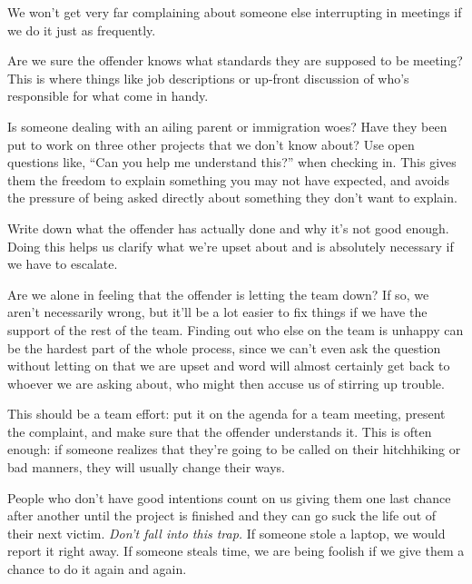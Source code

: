 \documentclass[
]{krantz}
\providecommand{\tightlist}{%
  \setlength{\itemsep}{0pt}\setlength{\parskip}{0pt}}
\begin{document}
\begin{description}
\tightlist
\item[Make sure we are not guilty of the same sin.]
We won't get very far complaining about someone else interrupting in meetings
if we do it just as frequently.
\item[Check expectations.]
Are we sure the offender knows what standards they are supposed to be meeting?
This is where things like job descriptions
or up-front discussion of who's responsible for what
come in handy.
\item[Check the situation.]
Is someone dealing with an ailing parent or immigration woes?
Have they been put to work on three other projects that we don't know about?
Use open questions like, ``Can you help me understand this?'' when checking in.
This gives them the freedom to explain something you may not have expected,
and avoids the pressure of being asked directly about something they don't want to explain.
\item[Document the offense.]
Write down what the offender has actually done and why it's not good enough.
Doing this helps us clarify what we're upset about
and is absolutely necessary if we have to escalate.
\item[Check with other team members.]
Are we alone in feeling that the offender is letting the team down?
If so, we aren't necessarily wrong,
but it'll be a lot easier to fix things if we have the support of the rest of the team.
Finding out who else on the team is unhappy can be the hardest part of the whole process,
since we can't even ask the question without letting on that we are upset
and word will almost certainly get back to whoever we are asking about,
who might then accuse us of stirring up trouble.
\item[Talk with the offender.]
This should be a team effort:
put it on the agenda for a team meeting,
present the complaint,
and make sure that the offender understands it.
This is often enough:
if someone realizes that they're going to be called on their hitchhiking or bad manners,
they will usually change their ways.
\item[Escalate as soon as there's a second offense.]
People who don't have good intentions
count on us giving them one last chance after another
until the project is finished and they can go suck the life out of their next victim.
\emph{Don't fall into this trap.}
If someone stole a laptop, we would report it right away.
If someone steals time,
we are being foolish if we give them a chance to do it again and again.
\end{description}
\end{document}
